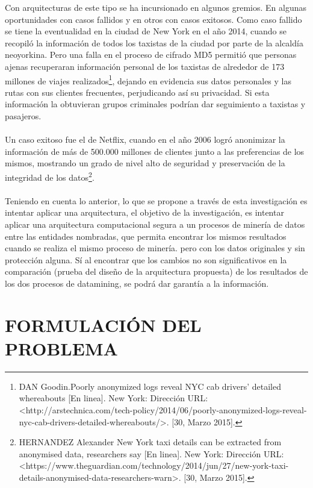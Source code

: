 \documentclass[a4paper,openright,12pt]{book}
\theoremstyle{definition}
\theoremstyle{remark}
\begin{document}
Con arquitecturas de  este  tipo se ha incursionado  en  algunos gremios. En algunas oportunidades con casos fallidos  y en otros con casos exitosos. Como caso fallido se tiene  la eventualidad en la  ciudad de New York en el año 2014, cuando se recopiló la información de todos los taxistas de la ciudad por parte de la alcaldía neoyorkina. Pero una falla en el proceso de cifrado MD5 permitió que personas ajenas recuperaran información personal de los taxistas de alrededor de 173 millones de viajes realizados\footnote{DAN Goodin.Poorly anonymized logs reveal NYC cab drivers’ detailed whereabouts [En linea]. New York: Dirección URL: <http://arstechnica.com/tech-policy/2014/06/poorly-anonymized-logs-reveal-nyc-cab-drivers-detailed-whereabouts/>. [30, Marzo 2015].}, dejando en evidencia sus datos personales y las rutas con sus clientes frecuentes,  perjudicando así su privacidad. Si esta información la obtuvieran grupos criminales podrían dar seguimiento a taxistas y pasajeros.\\\\
Un caso exitoso fue el de Netflix, cuando en el año 2006 logró anonimizar la información de más de 500.000 millones de clientes junto a las preferencias de los mismos, mostrando un grado de nivel alto de seguridad y preservación de la integridad de los datos\footnote{HERNANDEZ Alexander New York taxi details can be extracted from anonymised data, researchers say [En linea]. New York: Dirección URL: <https://www.theguardian.com/technology/2014/jun/27/new-york-taxi-details-anonymised-data-researchers-warn>. [30, Marzo 2015].}.\\\\
Teniendo  en cuenta lo anterior, lo  que se propone  a través de  esta investigación es intentar aplicar una arquitectura, el objetivo de la investigación, es intentar aplicar una arquitectura computacional segura a un procesos de minería de datos entre las entidades nombradas, que  permita encontrar los mismos resultados cuando se realiza el mismo proceso de minería. pero con los datos originales y sin protección alguna. Sí al encontrar que los cambios no son significativos en la comparación (prueba del diseño de la arquitectura propuesta) de los resultados de los dos procesos de datamining, se podrá dar garantía a la información.

\section{FORMULACIÓN DEL PROBLEMA}
\end{document}
